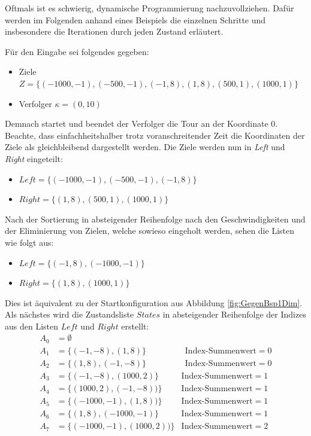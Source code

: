 \documentclass[german,version-2019-11]{uzl-thesis}
\begin{document}
Oftmals ist es schwierig, dynamische Programmierung nachzuvollziehen. Dafür werden im Folgenden anhand eines Beispiels die einzelnen Schritte und insbesondere die Iterationen durch jeden Zustand erläutert.
\begin{example}
\label{example:1D}
Für den Eingabe sei folgendes gegeben:
\begin{itemize}
\item Ziele $Z=\{(-1000,-1),(-500,-1),(-1,8),(1,8),(500,1),(1000,1)\}$
\item Verfolger $\kappa=(0,10)$
\end{itemize}
Demnach startet und beendet der Verfolger die Tour an der Koordinate $0$. Beachte, dass einfachheitshalber trotz voranschreitender Zeit die Koordinaten der Ziele als gleichbleibend dargestellt werden. Die Ziele werden nun in \emph{Left} und \emph{Right} eingeteilt:
\begin{itemize}
\item $Left=\{(-1000,-1),(-500,-1),(-1,8)\}$ 
\item $Right=\{(1,8),(500,1),(1000,1)\}$
\end{itemize}
Nach der Sortierung in absteigender Reihenfolge nach den Geschwindigkeiten und der Eliminierung von Zielen, welche sowieso eingeholt werden, sehen die Listen wie folgt aus:
\begin{itemize}
\item $Left=\{(-1,8),(-1000,-1)\}$ 
\item $Right=\{(1,8),(1000,1)\}$
\end{itemize}
Dies ist äquivalent zu der Startkonfiguration aus Abbildung \ref{fig:GegenBsp1Dim}. Als nächstes wird die Zustandsliste $States$ in absteigender Reihenfolge der Indizes aus den Listen $Left$ und $Right$ erstellt:
\begin{align*}
A_0&=\emptyset\\
A_1&=\{(-1, -8), (1, 8)\} &~~\text{Index-Summenwert}=0\\
A_2&=\{(1, 8), (-1, -8)\} &~~\text{Index-Summenwert}=0\\ 
A_3&=\{(-1, -8), (1000, 2)\} &\text{Index-Summenwert}=1\\
A_4&=\{(1000, 2), (-1, -8))\} &\text{Index-Summenwert}=1\\
A_5&=\{(-1000, -1), (1, 8))\} &\text{Index-Summenwert}=1\\
A_6&=\{(1, 8), (-1000, -1)\} &\text{Index-Summenwert}=1\\
A_7&=\{(-1000, -1), (1000, 2))\} &\text{Index-Summenwert}=2\\

\end{align*}
\end{example}
\end{document}
